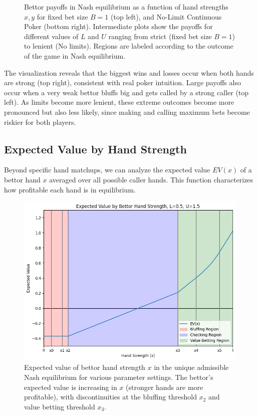 \documentclass[../../main/main.tex]{subfiles}
\begin{document}
\begin{figure}[p]
\begin{adjustwidth}{-1.25in}{-1.25in}
\begin{minipage}{0.4\textwidth}
        \end{minipage}
    \end{adjustwidth}
    \caption{Bettor payoffs in Nash equilibrium as a function of hand strengths $x, y$ for fixed bet size $B=1$ (top left), and No-Limit Continuous Poker (bottom right). Intermediate plots show the payoffs for different values of $L$ and $U$ ranging from strict (fixed bet size $B=1$) to lenient (No limits). Regions are labeled according to the outcome of the game in Nash equilibrium.}
    \label{fig:payoffs}
\end{figure}

\restoregeometry

The visualization reveals that the biggest wins and losses occur when both hands are strong (top right), consistent with real poker intuition. Large payoffs also occur when a very weak bettor bluffs big and gets called by a strong caller (top left). As limits become more lenient, these extreme outcomes become more pronounced but also less likely, since making and calling maximum bets become riskier for both players.

\subsection{Expected Value by Hand Strength}

Beyond specific hand matchups, we can analyze the expected value $EV(x)$ of a bettor hand $x$ averaged over all possible caller hands. This function characterizes how profitable each hand is in equilibrium.

\begin{figure}[h!]
    \centering
    \includegraphics[width=\textwidth]{../payoff_analysis/images/ExpectedPayoffs.png}
    \caption{Expected value of bettor hand strength $x$ in the unique admissible Nash equilibrium for various parameter settings. The bettor's expected value is increasing in $x$ (stronger hands are more profitable), with discontinuities at the bluffing threshold $x_2$ and value betting threshold $x_3$.}
    \label{fig:ev_x}
\end{figure}
\end{document}
